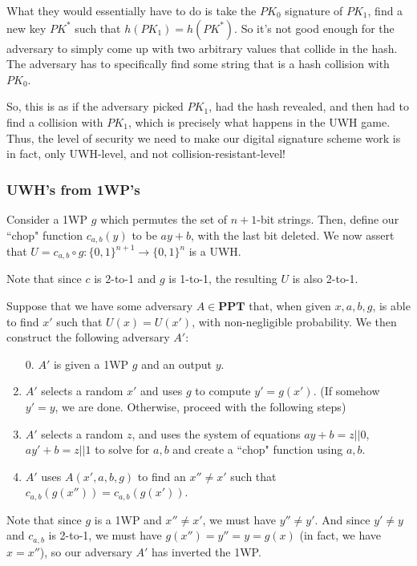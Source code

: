 \documentclass[11pt]{article}
\newcommand{\PPT}{\mathbf{PPT}}
\begin{document}
What they would essentially have to do is take the \(PK_0\) signature of \(PK_1\), find a new key \(PK^*\) such that \(h(PK_1)=h(PK^*)\). So it's not good enough for the adversary to simply come up with two arbitrary values that collide in the hash. The adversary has to specifically find some string that is a hash collision with \(PK_0\). \smallskip

So, this is as if the adversary picked \(PK_1\), had the hash revealed, and then had to find a collision with \(PK_1\), which is precisely what happens in the UWH game. Thus, the level of security we need to make our digital signature scheme work is in fact, only UWH-level, and not collision-resistant-level!

\newpage
\subsubsection{UWH's from 1WP's}

Consider a 1WP \(g\) which permutes the set of \(n+1\)-bit strings. Then, define our ``chop" function \(c_{a,b}(y)\) to be \(ay+b\), with the last bit deleted. We now assert that \(U = c_{a,b}\circ g: \{0,1\}^{n+1}\to\{0,1\}^n\) is a UWH. \smallskip

Note that since \(c\) is 2-to-1 and \(g\) is 1-to-1, the resulting \(U\) is also 2-to-1.\bigskip

Suppose that we have some adversary \(A\in\PPT\) that, when given \(x,a,b,g\), is able to find \(x'\) such that \(U(x)=U(x')\), with non-negligible probability. We then construct the following adversary \(A'\):\medskip

\begin{enumerate}
\item [0.] \(A'\) is given a 1WP \(g\) and an output \(y\).
\item \(A'\) selects a random \(x'\) and uses \(g\) to compute \(y'=g(x')\). (If somehow \(y'=y\), we are done. Otherwise, proceed with the following steps)
\item \(A'\) selects a random \(z\), and uses the system of equations \(ay+b = z||0\), \(ay'+b=z||1\) to solve for \(a,b\) and create a ``chop" function using \(a,b\).
\item \(A'\) uses \(A(x',a,b,g)\) to find an \(x''\ne x'\) such that \(c_{a,b}(g(x'')) = c_{a,b}(g(x'))\).
\end{enumerate}

Note that since \(g\) is a 1WP and \(x''\ne x'\), we must have \(y''\ne y'\). And since \(y'\ne y\) and \(c_{a,b}\) is 2-to-1, we must have \(g(x'') = y'' = y = g(x)\) (in fact, we have \(x=x''\)), so our adversary \(A'\) has inverted the 1WP.\bigskip
\end{document}

